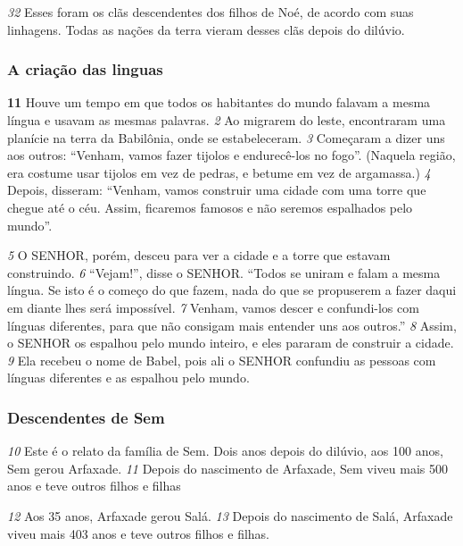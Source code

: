 \bigskip
\textit{\tiny 32}
 Esses foram os clãs descendentes dos filhos de Noé, de acordo com suas linhagens. Todas as nações da terra vieram desses clãs depois do dilúvio.



\bigskip
\subsubsection*{A criação das linguas}


\textbf{\large 11}
 Houve um tempo em que todos os habitantes do mundo falavam a mesma língua e usavam as mesmas palavras. 
\textit{\tiny 2}
 Ao migrarem do leste, encontraram uma planície na terra da Babilônia, onde se estabeleceram. 
\textit{\tiny 3}
 Começaram a dizer uns aos outros: “Venham, vamos fazer tijolos e endurecê-los no fogo”. (Naquela região, era costume usar tijolos em vez de pedras, e betume em vez de argamassa.) 
\textit{\tiny 4}
 Depois, disseram: “Venham, vamos construir uma cidade com uma torre que chegue até o céu. Assim, ficaremos famosos e não seremos espalhados pelo mundo”.



\bigskip
\textit{\tiny 5}
 O SENHOR, porém, desceu para ver a cidade e a torre que estavam construindo. 
\textit{\tiny 6}
 “Vejam!”, disse o SENHOR. “Todos se uniram e falam a mesma língua. Se isto é o começo do que fazem, nada do que se propuserem a fazer daqui em diante lhes será impossível. 
\textit{\tiny 7}
 Venham, vamos descer e confundi-los com línguas diferentes, para que não consigam mais entender uns aos outros.” 
\textit{\tiny 8}
 Assim, o SENHOR os espalhou pelo mundo inteiro, e eles pararam de construir a cidade. 
\textit{\tiny 9}
 Ela recebeu o nome de Babel, pois ali o SENHOR confundiu as pessoas com línguas diferentes e as espalhou pelo mundo.



\bigskip
\subsubsection*{Descendentes de Sem}


\textit{\tiny 10}
 Este é o relato da família de Sem. Dois anos depois do dilúvio, aos 100 anos, Sem gerou Arfaxade. 
\textit{\tiny 11}
 Depois do nascimento de Arfaxade, Sem viveu mais 500 anos e teve outros filhos e filhas



\bigskip
\textit{\tiny 12}
 Aos 35 anos, Arfaxade gerou Salá. 
\textit{\tiny 13}
 Depois do nascimento de Salá, Arfaxade viveu mais 403 anos e teve outros filhos e filhas.




